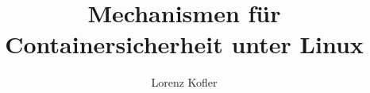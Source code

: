\newenvironment{italicquotes}
{\begin{quote}\itshape}
{\end{quote}}
\newcommand\myworries[1]{\textcolor{red}{#1}}
\newcommand\todo[1]{\textcolor{red}{#1}}
\documentclass[bachelor,german,smartquotes]{hgbthesis}

\RequirePackage[utf8]{inputenc}		%

\graphicspath{{images/}}    %

\title{Mechanismen für Containersicherheit unter Linux}
\author{Lorenz Kofler}



\frontmatter                    %

\maketitle
\tableofcontents

		
			

\mainmatter          %




\appendix                                            %


\MakeBibliography                        %

%


